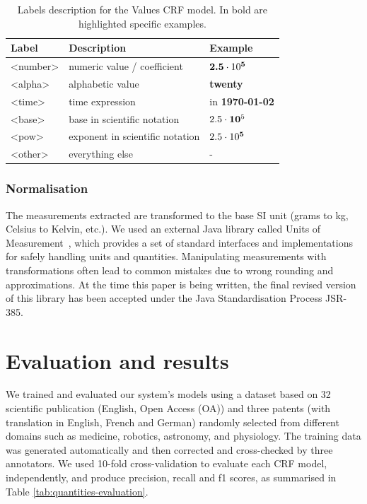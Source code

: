 \begin{table}[ht]
  \caption{Labels description for the Values CRF model. In bold are highlighted specific examples.}
  \label{tab:values-model-labels}
  \begin{tabular}{lll}
    \toprule
    Label & Description & Example\\
    \midrule
    <number> & numeric value / coefficient & $\textbf{2.5}\cdot10\textsuperscript{\textbf{5}}$ \\
    <alpha> & alphabetic value & \textbf{twenty} \\
    <time> & time expression  & in \textbf{1970-01-02}\\
    <base> & base in scientific notation & $2.5\cdot\textbf{10}\textsuperscript{5}$\\
    <pow> & exponent in scientific notation & $2.5\cdot10\textsuperscript{\textbf{5}}$ \\
    <other> & everything else & - \\
  \bottomrule
\end{tabular}
\end{table}

\subsubsection{Normalisation}

The measurements extracted are transformed to the base SI unit (grams to kg, Celsius to Kelvin, etc.). We used an external Java library called Units of Measurement~\cite{units_of_measurement}, which provides a set of standard interfaces and implementations for safely handling units and quantities. Manipulating measurements with transformations often lead to common mistakes due to wrong rounding and approximations. 
At the time this paper is being written, the final revised version of this library has been accepted under the Java Standardisation Process JSR-385.

\section{Evaluation and results}
\label{sec:results}

We trained and evaluated our system's models using a dataset based on 32 scientific publication (English, Open Access (OA)) and three patents (with translation in English, French and German) randomly selected from different domains such as medicine, robotics, astronomy, and physiology. The training data was generated automatically and then corrected and cross-checked by three annotators. We used 10-fold cross-validation to evaluate each CRF model, independently, and produce precision, recall and f1 scores, as summarised in Table \ref{tab:quantities-evaluation}. 

